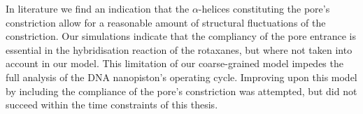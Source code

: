 In literature we find an indication that the $\alpha$-helices constituting the pore's
constriction allow for a reasonable amount of structural fluctuations of the
constriction.\cite{willems2021} Our simulations indicate that the compliancy of the pore
entrance is essential in the hybridisation reaction of the rotaxanes, but where not taken
into account in our model. This limitation of our coarse-grained model impedes the full
analysis of the DNA nanopiston's operating cycle. Improving upon this model by including
the compliance of the pore's constriction was attempted, but did not succeed within the
time constraints of this thesis.


